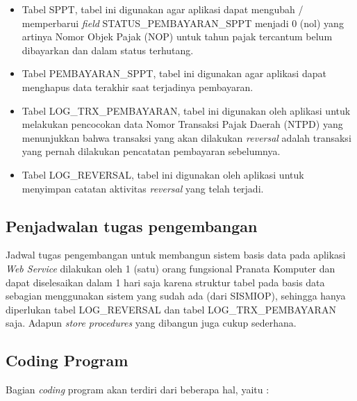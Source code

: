 \documentclass[pdftex,12pt, oneside]{article}
\begin{document}
\begin{enumerate}[1.]
	\begin{itemize}
		\item Tabel SPPT, tabel ini digunakan agar aplikasi dapat mengubah / memperbarui \textit{field} STATUS\_PEMBAYARAN\_SPPT menjadi 0 (nol) yang artinya Nomor Objek Pajak (NOP) untuk tahun pajak tercantum belum dibayarkan dan dalam status terhutang.
		\item Tabel PEMBAYARAN\_SPPT, tabel ini digunakan agar aplikasi dapat menghapus data terakhir saat terjadinya pembayaran.
		\item Tabel LOG\_TRX\_PEMBAYARAN, tabel ini digunakan oleh aplikasi untuk melakukan pencocokan data Nomor Transaksi Pajak Daerah (NTPD) yang menunjukkan bahwa transaksi yang akan dilakukan \textit{reversal} adalah transaksi yang pernah dilakukan pencatatan pembayaran sebelumnya.
		\item Tabel LOG\_REVERSAL, tabel ini digunakan oleh aplikasi untuk menyimpan catatan aktivitas \textit{reversal} yang telah terjadi.
	\end{itemize}
\end{enumerate}

\subsection{Penjadwalan tugas pengembangan}

Jadwal tugas pengembangan untuk membangun sistem basis data pada aplikasi \textit{Web Service} dilakukan oleh 1 (satu) orang fungsional Pranata Komputer dan dapat diselesaikan dalam 1 hari saja karena struktur tabel pada basis data sebagian menggunakan sistem yang sudah ada (dari SISMIOP), sehingga hanya diperlukan tabel LOG\_REVERSAL dan tabel LOG\_TRX\_PEMBAYARAN saja. Adapun \textit{store procedures} yang dibangun juga cukup sederhana.

\subsection{Coding Program}

Bagian \textit{coding} program akan terdiri dari beberapa hal, yaitu :
\end{document}
